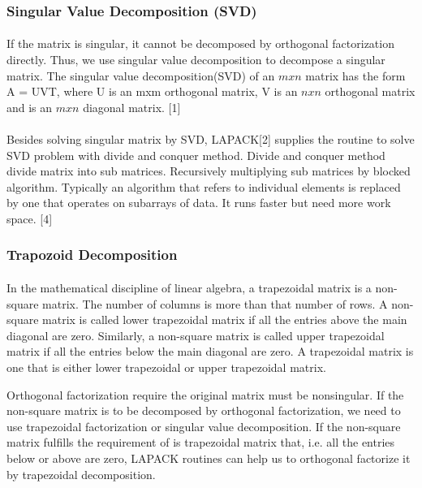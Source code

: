 \documentclass[pdftex,12pt,a4paper]{article}
\begin{document}
\subsubsection{Singular Value Decomposition (SVD)}
\paragraph{}
If the matrix is singular, it cannot be decomposed by orthogonal factorization directly.   Thus, we use singular value decomposition to decompose a singular matrix. The singular value decomposition(SVD) of an $m x n$ matrix has the form A = UVT, where U is an mxm orthogonal matrix, V is an $n x n$ orthogonal matrix and is an $m x n$ diagonal matrix. [1]
\paragraph{}
Besides solving singular matrix by SVD, LAPACK[2] supplies the routine to solve SVD problem with divide and conquer method. Divide and conquer method divide matrix into sub matrices. Recursively multiplying sub matrices by blocked algorithm. Typically an algorithm that refers to individual elements is replaced by one that operates on subarrays of data. It runs faster but need more work space. [4]%
\subsubsection{Trapozoid Decomposition}
\paragraph{}
In the mathematical discipline of linear algebra, a trapezoidal matrix is a non-square matrix. The number of columns is more than that number of rows.  A non-square matrix is called lower trapezoidal matrix if all the entries above the main diagonal are zero. Similarly, a non-square matrix is called upper trapezoidal matrix if all the entries below the main diagonal are zero. A trapezoidal matrix is one that is either lower trapezoidal or upper trapezoidal matrix. 

 Orthogonal factorization require the original matrix must be nonsingular. If the non-square matrix is to be decomposed by orthogonal factorization, we need to use trapezoidal factorization or singular value decomposition. If the non-square matrix fulfills the requirement of is trapezoidal matrix that, i.e. all the entries below or above are zero, LAPACK routines can help us to orthogonal factorize it by trapezoidal decomposition.
\end{document}
